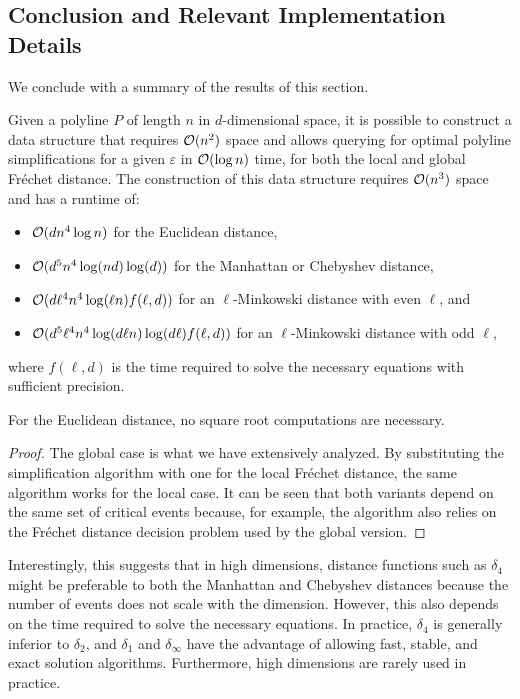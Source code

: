 \subsection{Conclusion and Relevant Implementation Details}
We conclude with a summary of the results of this section.
\begin{theorem}\label{thm:query-ds}
	Given a polyline \(P\) of length \(n\) in \(d\)-dimensional space, it is possible to construct a data structure that requires \(\mathcal{O}(n^2)\) space and allows querying for optimal polyline simplifications for a given \(\varepsilon\) in \(\mathcal{O}(\log n)\) time, for both the local and global Fréchet distance. The construction of this data structure requires \(\mathcal{O}(n^3)\) space and has a runtime of:
	\begin{itemize}
		\item \(\mathcal{O}(d n^4 \log n)\) for the Euclidean distance,
		\item \(\mathcal{O}(d^5 n^4 \log(nd)\log(d))\) for the Manhattan or Chebyshev distance,
		\item \(\mathcal{O}(d\ell^4 n^4 \log(\ell n)f(\ell, d))\) for an \(\ell\)-Minkowski distance with even \(\ell\), and
		\item \(\mathcal{O}(d^5\ell^4 n^4 \log(d \ell n)\log(d \ell)f(\ell, d))\) for an \(\ell\)-Minkowski distance with odd \(\ell\),
	\end{itemize}
	where \(f(\ell, d)\) is the time required to solve the necessary equations with sufficient precision.

	For the Euclidean distance, no square root computations are necessary.
\end{theorem}

\begin{proof}
  The global case is what we have extensively analyzed. By substituting the simplification algorithm with one for the local Fréchet distance, the same algorithm works for the local case. It can be seen that both variants depend on the same set of critical events because, for example, the \citeauthor{computational_geometric_methods_for_polygonal_approximations_of_a_curve} algorithm also relies on the Fréchet distance decision problem used by the global version.
\end{proof}

Interestingly, this suggests that in high dimensions, distance functions such as \(\delta_4\) might be preferable to both the Manhattan and Chebyshev distances because the number of events does not scale with the dimension. However, this also depends on the time required to solve the necessary equations. In practice, \(\delta_4\) is generally inferior to \(\delta_2\), and \(\delta_1\) and \(\delta_\infty\) have the advantage of allowing fast, stable, and exact solution algorithms. Furthermore, high dimensions are rarely used in practice.

